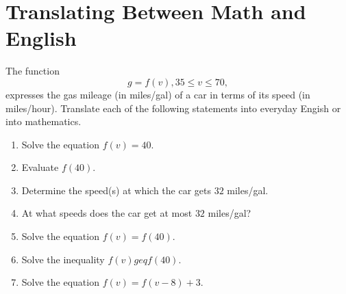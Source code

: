 \documentclass{ximera}
\begin{document}
\section{Translating Between Math and English}

\begin{question}  \label{QFun25}

The function
\[
   g = f(v) , 35 \leq v \leq 70 ,
\]
expresses the gas mileage (in miles/gal) of a car in terms of its speed (in miles/hour). Translate each of the following statements into everyday Engish or into mathematics.

\begin{enumerate}

\item Solve the equation $f(v) = 40$.

\item Evaluate $f(40)$.

\item Determine the speed(s) at which the car gets $32$ miles/gal.

\item At what speeds does the car get at most $32$ miles/gal?

\item Solve the equation $f(v)=f(40)$.


\item Solve the inequality $f(v) geq f(40)$.

\item Solve the equation $f(v)=f(v-8) + 3$.

\end{enumerate}
\end{question}
\end{document}
